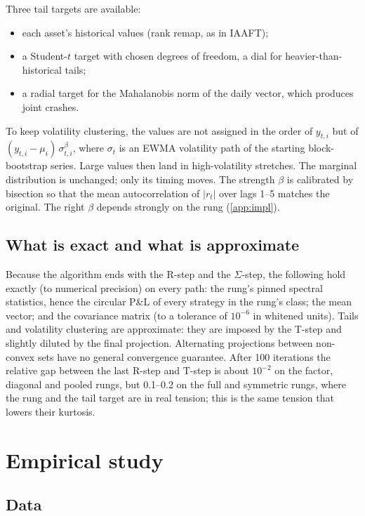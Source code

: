 \documentclass[11pt]{article}
\theoremstyle{definition}
\theoremstyle{remark}
\begin{document}
Three tail targets are available:
\begin{itemize}[leftmargin=*,itemsep=2pt]
\item each asset's historical values (rank remap, as in IAAFT);
\item a Student-$t$ target with chosen degrees of freedom, a dial for heavier-than-historical tails;
\item a radial target for the Mahalanobis norm of the daily vector, which produces joint crashes.
\end{itemize}
To keep volatility clustering, the values are not assigned in the order of $y_{t,i}$ but of $(y_{t,i}-\mu_i)\,\sigma_{t,i}^{\beta}$, where $\sigma_t$ is an EWMA
volatility path of the starting block-bootstrap series. Large values then land in high-volatility stretches. The marginal distribution is unchanged; only its
timing moves. The strength $\beta$ is calibrated by bisection so that the mean autocorrelation of $|r_t|$ over lags 1--5 matches the original. The right $\beta$
depends strongly on the rung (\cref{app:impl}).

\subsection{What is exact and what is approximate}

Because the algorithm ends with the R-step and the $\Sigma$-step, the following hold exactly (to numerical precision) on every path:
the rung's pinned spectral statistics, hence the circular P\&L of every strategy in the rung's class; the mean vector; and the covariance matrix (to a
tolerance of $10^{-6}$ in whitened units). Tails and volatility clustering are approximate: they are imposed by the T-step and slightly diluted by the final
projection. Alternating projections between non-convex sets have no general convergence guarantee. After 100 iterations the relative gap between the last R-step and
T-step is about $10^{-2}$ on the factor, diagonal and pooled rungs, but 0.1--0.2 on the full and symmetric rungs, where the rung and the tail target are in real
tension; this is the same tension that lowers their kurtosis.

\section{Empirical study}
\label{sec:empirical}

\subsection{Data}
\end{document}
